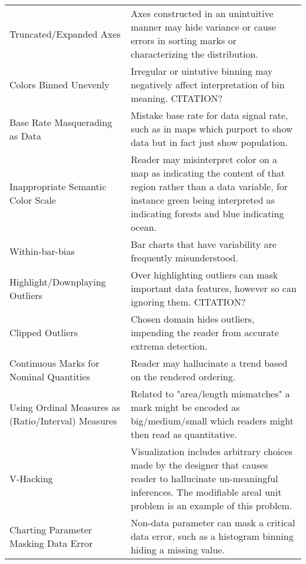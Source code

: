 \begin{table*}[]
\begin{tabular}{p{5cm}p{12cm}}
 \rowcolor{colorc}Truncated/Expanded Axes & Axes constructed in an unintuitive manner may hide variance or cause errors in sorting marks or characterizing the distribution. \cite{pandey2015deceptive, correll2017black, cleveland1982variables, ritchie2019lie, correll2019truncating}\\
 \rowcolor{colorc-opaque}Colors Binned Unevenly & Irregular or uintutive binning may negatively affect interpretation of bin meaning. CITATION?\\
 \rowcolor{colorc}Base Rate Masquerading as Data & Mistake base rate for data signal rate, such as in maps which purport to show data but in fact just show population. \cite{correll2016surprise}\\
 \rowcolor{colorc-opaque}Inappropriate Semantic Color Scale  & Reader may misinterpret color on a map as indicating the content of that region rather than a data variable, for instance green being interpreted as indicating forests and blue indicating ocean. \\
 \rowcolor{colorc}Within-bar-bias & Bar charts that have variability are frequently misunderstood. \cite{newman2012bar}\\
 \rowcolor{colorc-opaque}Highlight/Downplaying Outliers & Over highlighting outliers can mask important data features, however so can ignoring them. CITATION?\\
 \rowcolor{colorc}Clipped Outliers & Chosen domain hides outliers, impending the reader from accurate extrema detection. \\
 \rowcolor{colorc-opaque}Continuous Marks for Nominal Quantities & Reader may hallucinate a trend based on the rendered ordering. \cite{mcnuttlinting, zacks1999bars}\\
 \rowcolor{colorc}Using Ordinal Measures as (Ratio/Interval) Measures & Related to "area/length mismatches" a mark might be encoded as big/medium/small which readers might then read as quantitative. \cite{stevens1946theory, few2019loom}\\
 \rowcolor{colorc-opaque}V-Hacking & Visualization includes arbitrary choices made by the designer that causes reader to hallucinate un-meaningful inferences. The modifiable areal unit problem is an example of this problem. \cite{fotheringham1991modifiable, kindlmann2014algebraic}\\
 \rowcolor{colorc}Charting Parameter Masking Data Error & Non-data parameter can mask a critical data error, such as a histogram binning hiding a missing value. \cite{correll2018looks}\\

\end{tabular}
\end{table*}
